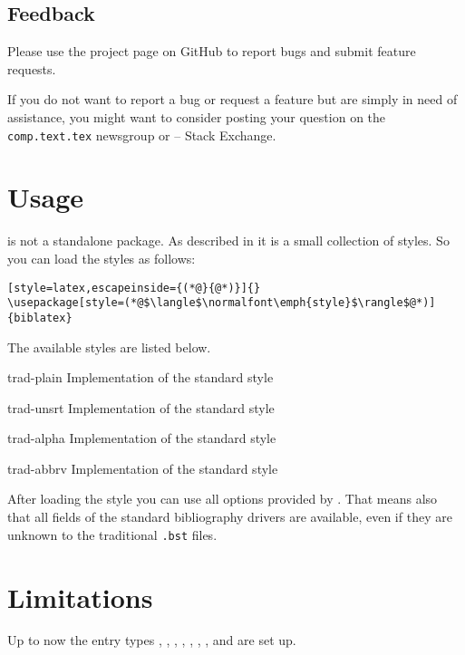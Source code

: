 \documentclass{ltxdockit}[2011/03/25]
\begin{document}
\subsection{Feedback}\label{subsec:int:feb}

Please use the  project page on GitHub to report bugs and submit feature requests.

If you do not want to report a bug or request a feature but are simply in need of assistance, you might want to consider posting your question on the \texttt{comp.text.tex} newsgroup or \tex{} -- \latex Stack Exchange.

\section{Usage}

 is not a standalone package. As described in  it is
a small collection of styles. So you can load the styles as follows:

\begin{lstlisting}[style=latex,escapeinside={(*@}{@*)}]{}
\usepackage[style=(*@$\langle$\normalfont\emph{style}$\rangle$@*)]{biblatex}
\end{lstlisting}
The available styles are listed below.
\begin{marglist}

\item[trad-plain] Implementation of the standard style 
\item[trad-unsrt] Implementation of the standard style 
\item[trad-alpha] Implementation of the standard style 
\item[trad-abbrv] Implementation of the standard style 

\end{marglist}

After loading the style you can use all options provided by .
That means also that all fields of the standard bibliography drivers are available,
even if they are unknown to the traditional \texttt{.bst} files.

\section{Limitations}

Up to now the entry types , , ,
, , , ,
 and  are set up.
\end{document}
